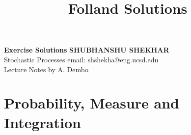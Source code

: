 \documentclass[a4paper, 10pt]{article}
\title{Folland Solutions}
\begin{document}
\noindent
\large\textbf{Exercise Solutions} \hfill \textbf{SHUBHANSHU SHEKHAR} \\
\normalsize Stochastic Processes \hfill email: shshekha@eng.ucsd.edu  \\
\normalsize  \hfill Lecture Notes by A. Dembo\\
\noindent\makebox[\linewidth]{\rule{\textwidth}{0.4pt}}

\tableofcontents 
\newpage 

\section{Probability, Measure and Integration}
\label{sec:chapter1}

\newpage 
\end{document}
